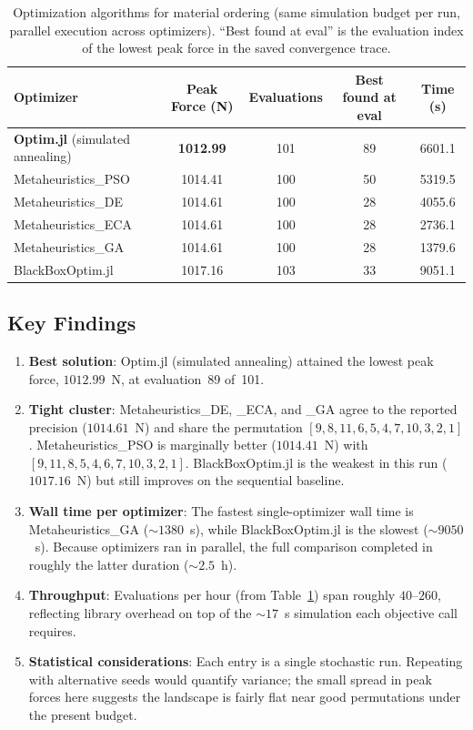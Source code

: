 \documentclass[11pt,a4paper]{article}
\begin{document}
\begin{table}[!h]
\centering
\caption{Optimization algorithms for material ordering (same simulation budget per run, parallel execution across optimizers). ``Best found at eval'' is the evaluation index of the lowest peak force in the saved convergence trace.}
\label{tab:optimizer_comparison}
\begin{tabular}{lcccc}
\toprule
Optimizer & Peak Force (N) & Evaluations & Best found at eval & Time (s) \\
\midrule
\textbf{Optim.jl} (simulated annealing) & \textbf{1012.99} & 101 & 89 & 6601.1 \\
Metaheuristics\_PSO & 1014.41 & 100 & 50 & 5319.5 \\
Metaheuristics\_DE & 1014.61 & 100 & 28 & 4055.6 \\
Metaheuristics\_ECA & 1014.61 & 100 & 28 & 2736.1 \\
Metaheuristics\_GA & 1014.61 & 100 & 28 & 1379.6 \\
BlackBoxOptim.jl & 1017.16 & 103 & 33 & 9051.1 \\
\bottomrule
\end{tabular}
\end{table}

\subsection{Key Findings}

\begin{enumerate}
    \item \textbf{Best solution}: Optim.jl (simulated annealing) attained the lowest peak force, $1012.99$~N, at evaluation~89 of~101.
    \item \textbf{Tight cluster}: Metaheuristics\_DE, \_ECA, and \_GA agree to the reported precision ($1014.61$~N) and share the permutation $[9, 8, 11, 6, 5, 4, 7, 10, 3, 2, 1]$. Metaheuristics\_PSO is marginally better ($1014.41$~N) with $[9, 11, 8, 5, 4, 6, 7, 10, 3, 2, 1]$. BlackBoxOptim.jl is the weakest in this run ($1017.16$~N) but still improves on the sequential baseline.
    \item \textbf{Wall time per optimizer}: The fastest single-optimizer wall time is Metaheuristics\_GA ($\sim 1380$~s), while BlackBoxOptim.jl is the slowest ($\sim 9050$~s). Because optimizers ran in parallel, the full comparison completed in roughly the latter duration ($\sim 2.5$~h).
    \item \textbf{Throughput}: Evaluations per hour (from Table~\ref{tab:optimizer_comparison}) span roughly $40$--$260$, reflecting library overhead on top of the $\sim 17$~s simulation each objective call requires.
    \item \textbf{Statistical considerations}: Each entry is a single stochastic run. Repeating with alternative seeds would quantify variance; the small spread in peak forces here suggests the landscape is fairly flat near good permutations under the present budget.
\end{enumerate}
\end{document}

